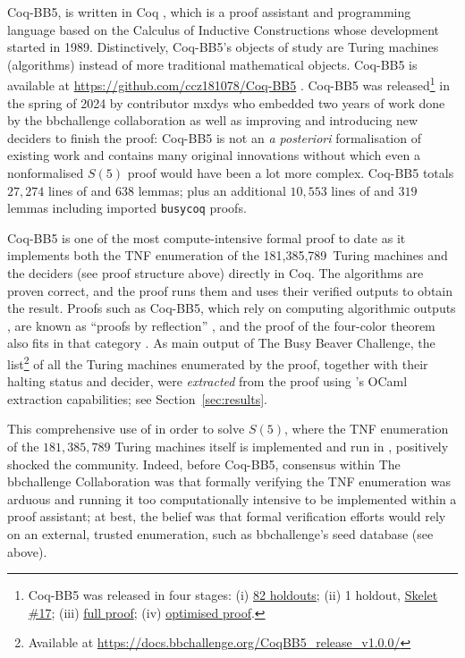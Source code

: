 \documentclass[a4paper,british]{article}
\theoremstyle{definition} %
\numberwithin{equation}{section}
\theoremstyle{definition} %
\newcommand{\BBtheFifthTNF}{181{,}385{,}789}
\newcommand{\CoqBB}{Coq-BB5\xspace}
\begin{document}
\CoqBB, is written in Coq \cite{the_coq_development_team_2024_14542673}, which is a proof assistant and programming language based on the Calculus of Inductive Constructions \cite{CoC} whose development started in 1989. Distinctively, \CoqBB's objects of study are Turing machines (\ie algorithms) instead of more traditional mathematical objects. \CoqBB is available at \url{https://github.com/ccz181078/Coq-BB5} \cite{mxdys_2025_17061968}. \CoqBB was released\footnote{\CoqBB was released in four stages: (i) \href{https://discuss.bbchallenge.org/t/proving-bb-5-in-coq/225}{82 holdouts}; (ii) 1 holdout, \href{https://bbchallenge.org/1RB---_0LC1RE_0LD1LC_1RA1LB_0RB0RA}{Skelet \#17}; (iii) \href{https://discuss.bbchallenge.org/t/july-2nd-2024-we-have-proved-bb-5-47-176-870/237}{full proof}; (iv) \href{https://github.com/ccz181078/Coq-BB5}{optimised proof}.} in the spring of 2024 by contributor mxdys who embedded two years of work done by the bbchallenge collaboration as well as improving and introducing new deciders to finish the proof: \CoqBB is not an \textit{a posteriori} formalisation of existing work and contains many original innovations without which even a nonformalised $S(5)$ proof would have been a lot more complex. \CoqBB totals $27{,}274$ lines of \Coq and $638$ lemmas; plus an additional $10{,}553$ lines of \Coq and $319$ lemmas including imported \texttt{busycoq} proofs.

\CoqBB is one of the most compute-intensive formal proof to date as it implements both the TNF enumeration of the \BBtheFifthTNF\ Turing machines and the deciders (see proof structure above) directly in Coq. The algorithms are proven correct, and the proof runs them and uses their verified outputs to obtain the result. Proofs such as \CoqBB, which rely on computing algorithmic outputs \cite{vmcompute,nativecompute}, are known as ``proofs by reflection'' \cite{boutin1997using}, and the \Coq proof of the four-color theorem also fits in that category \cite{gonthier2010introduction}. As main output of The Busy Beaver Challenge, the list\footnote{Available at \url{https://docs.bbchallenge.org/CoqBB5_release_v1.0.0/}} of all the Turing machines enumerated by the \Coq proof, together with their halting status and decider, were \textit{extracted} from the proof using \Coq's OCaml extraction capabilities; see Section~\ref{sec:results}.

This comprehensive use of \Coq in order to solve $S(5)$, where the TNF enumeration of the $\BBtheFifthTNF$ Turing machines itself is implemented and run in \Coq, positively shocked the community. Indeed, before \CoqBB, consensus within The bbchallenge Collaboration  was that formally verifying the TNF enumeration was arduous and running it too computationally intensive to be implemented within a proof assistant; at best, the belief was that formal verification efforts would rely on an external, trusted enumeration, such as bbchallenge's seed database (see above).
\end{document}
